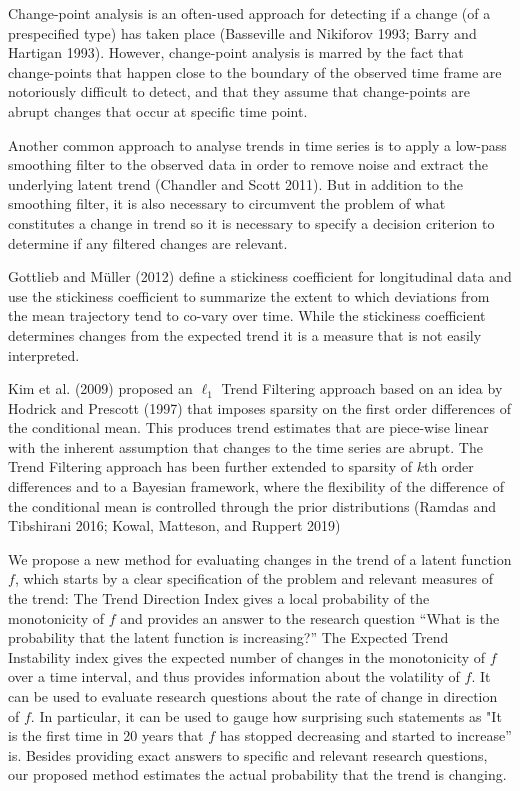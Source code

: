 \documentclass[
  11pt,
]{article}
\theoremstyle{nonumberplain}
\begin{document}
Change-point analysis is an often-used approach for detecting if a
change (of a prespecified type) has taken place (Basseville and
Nikiforov 1993; Barry and Hartigan 1993). However, change-point analysis
is marred by the fact that change-points that happen close to the
boundary of the observed time frame are notoriously difficult to detect,
and that they assume that change-points are abrupt changes that occur at
specific time point.

Another common approach to analyse trends in time series is to apply a
low-pass smoothing filter to the observed data in order to remove noise
and extract the underlying latent trend (Chandler and Scott 2011). But
in addition to the smoothing filter, it is also necessary to circumvent
the problem of what constitutes a change in trend so it is necessary to
specify a decision criterion to determine if any filtered changes are
relevant.

Gottlieb and Müller (2012) define a stickiness coefficient for
longitudinal data and use the stickiness coefficient to summarize the
extent to which deviations from the mean trajectory tend to co-vary over
time. While the stickiness coefficient determines changes from the
expected trend it is a measure that is not easily interpreted.

Kim et al. (2009) proposed an \(\ell_1\) Trend Filtering approach based
on an idea by Hodrick and Prescott (1997) that imposes sparsity on the
first order differences of the conditional mean. This produces trend
estimates that are piece-wise linear with the inherent assumption that
changes to the time series are abrupt. The Trend Filtering approach has
been further extended to sparsity of \(k\)th order differences and to a
Bayesian framework, where the flexibility of the difference of the
conditional mean is controlled through the prior distributions (Ramdas
and Tibshirani 2016; Kowal, Matteson, and Ruppert 2019)

We propose a new method for evaluating changes in the trend of a latent
function \(f\), which starts by a clear specification of the problem and
relevant measures of the trend: The Trend Direction Index gives a local
probability of the monotonicity of \(f\) and provides an answer to the
research question ``What is the probability that the latent function is
increasing?'' The Expected Trend Instability index gives the expected
number of changes in the monotonicity of \(f\) over a time interval, and
thus provides information about the volatility of \(f\). It can be used
to evaluate research questions about the rate of change in direction of
\(f\). In particular, it can be used to gauge how surprising such
statements as "It is the first time in 20 years that \(f\) has stopped
decreasing and started to increase'' is. Besides providing exact answers
to specific and relevant research questions, our proposed method
estimates the actual probability that the trend is changing.
\end{document}
